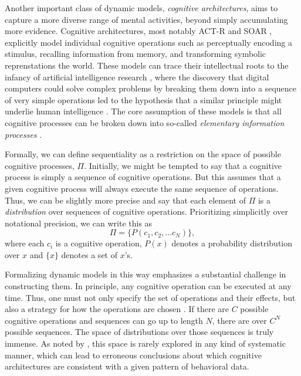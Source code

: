 
Another important class of dynamic models, \emph{cognitive architectures}, aims to capture a more diverse range of mental activities, beyond simply accumulating more evidence. Cognitive architectures, most notably ACT-R \citep{anderson1996act} and SOAR \citep{laird1987soar}, explicitly model individual cognitive operations such as perceptually encoding a stimulus, recalling information from memory, and transforming symbolic reprenstations the world. These models can trace their intellectual roots to the infancy of artificial intelligence research \citep{newell1956logic}, where the discovery that digital computers could solve complex problems by breaking them down into a sequence of very simple operations led to the hypothesis that a similar principle might underlie human intelligence \citep{newell1958elements,newell1972human}. The core assumption of these models is that all cognitive processes can be broken down into so-called \emph{elementary information processes} \citep{simon1979information,posner1982information,chase1978elementary}.

Formally, we can define sequentiality as a restriction on the space of possible cognitive processes, $\Pi$. Initially, we might be tempted to say that a cognitive process is simply a sequence of cognitive operations. But this assumes that a given cognitive process will always execute the same sequence of operations. Thus, we can be slightly more precise and say that each element of $\Pi$ is a \emph{distribution} over sequences of cognitive operations. Prioritizing simplicitly over notational precision, we can write this as 
\begin{equation}\label{eq:intro-sequential}
   \Pi = \{P(c_1, c_2, \ldots c_N)\},
\end{equation}
where each $c_i$ is a cognitive operation, $P(x)$ denotes a probability distribution over $x$ and $\{x\}$ denotes a set of $x$'s. 


Formalizing dynamic models in this way emphasizes a substantial challenge in constructing them. In principle, any cognitive operation can be executed at any time. Thus, one must not only specify the set of operations and their effects, but also a strategy for how the operations are chosen \citep{payne1988adaptive}. If there are $C$ possible cognitive operations and sequences can go up to length $N$, there are over $C^N$ possible sequences. The space of distributions over those sequences is truly immense. As noted by \citet{howes2009rational}, this space is rarely explored in any kind of systematic manner, which can lead to erroneous conclusions about which cognitive architectures are consistent with a given pattern of behavioral data.

